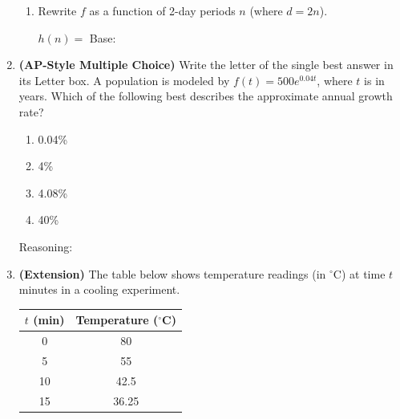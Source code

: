 \documentclass[10pt]{article}
\begin{document}
\begin{enumerate}[itemsep=18pt]
\begin{enumerate}[label=(\alph*), itemsep=8pt]
        \item Rewrite $f$ as a function of 2-day periods $n$ (where $d = 2n$).

              \vspace{0.06in}
              $h(n) = $ \smash{\gradedblank[id=hw4c1, type=short, points=1, answer={5 \cdot 9^n}]{8cm}{13pt}} \quad Base: \smash{\gradedblank[id=hw4c2, type=short, points=1, answer={9}]{2cm}{13pt}}
      \end{enumerate}

\item \textbf{(AP-Style Multiple Choice)} Write the letter of the single best answer in its Letter box. A population is modeled by $f(t) = 500 e^{0.04t}$,
      where $t$ is in years. Which of the following best describes the approximate annual growth rate?

      \medskip
      \begin{enumerate}[label=(\Alph*), itemsep=4pt]
        \item 0.04\%
        \item 4\%
        \item 4.08\%
        \item 40\%
      \end{enumerate}

      \vspace{0.06in}
      \leavevmode{}\phantom{Answer:} \gradedblank[id=hw5a, type=choice, points=1, answer=C]{1.5cm}{13pt} \quad Reasoning:
      \rubricbox[1pt]{\gradedblank[id=hw5b, type=rubric, points=2,
  display={$e^{0.04} \approx 1.0408$, a growth factor of 1.0408: about $4.08\%$ per year.}]{\linewidth}{13pt}}

\newpage
\item \textbf{(Extension)} The table below shows temperature readings (in ${}^\circ$C) at time
      $t$ minutes in a cooling experiment.

      \begin{center}
      \renewcommand{\arraystretch}{1.5}
      \begin{tabular}{c|c}
      $t$ (min) & Temperature (${}^\circ$C) \\ \hline
      0  & 80 \\
      5  & 55 \\
      10 & 42.5 \\
      15 & 36.25 \\
      \end{tabular}
      \end{center}


\end{enumerate}
\end{document}
